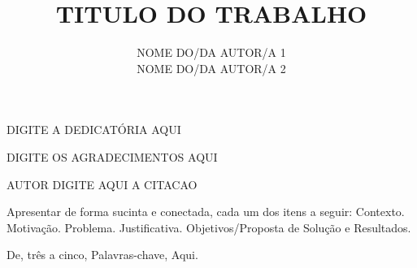 \documentclass[tec, rde, classic, a4paper]{x_cuidado_com_esse_arquivo}
\author{NOME DO/DA AUTOR/A 1 \\ NOME DO/DA AUTOR/A 2 }
\title{TITULO DO TRABALHO}
\begin{document}
    \ifbacapa %
    
\clearpage

    \ifbacontracapa{} %





    \begin{dedicatory}
    DIGITE A DEDICATÓRIA AQUI
    \end{dedicatory}
    
    \acknowledgements
    DIGITE OS AGRADECIMENTOS AQUI
    

    \clearpage
    
    \begin{epigraph}[NOTA]{AUTOR}
    DIGITE AQUI A CITACAO
    \end{epigraph}

    \resumo %
    Apresentar de forma sucinta e conectada, cada um dos itens a seguir: Contexto. Motivação. Problema. Justificativa. Objetivos/Proposta de Solução e  Resultados.

    \begin{keywords} %
    De, três a cinco, Palavras-chave, Aqui.
    \end{keywords}



    \listoffigures %
    \listoftables %


\end{document}
